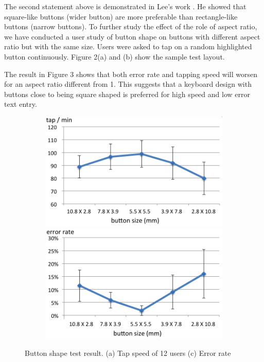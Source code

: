 The second statement above is demonstrated in Lee’s work \cite{performance-of-soft-button}. He showed that square-like buttons (wider button) are more preferable than rectangle-like buttons (narrow buttons). To further study the effect of the role of aspect ratio, we have conducted a user study of button shape on buttons with different aspect ratio but with the same size. Users were asked to tap on a random highlighted button continuously. Figure 2(a) and (b) show the sample test layout.

The result in Figure 3 shows that both error rate and tapping speed will worsen for an aspect ratio different from 1. This suggests that a keyboard design with buttons close to being square shaped is preferred for high speed and low error text entry.

\begin{figure}
  \begin{subfigure}{1\columnwidth}
  \centering
  \includegraphics[width=.8\columnwidth]{figures/F4-1.png}
  \caption{}
  \includegraphics[width=.8\columnwidth]{figures/F4-2.png}
  \caption{}
  \label{fig:f4}
  \end{subfigure}
  \caption{Button shape test result. (a) Tap speed of 12 users (c) Error rate}
\end{figure}

